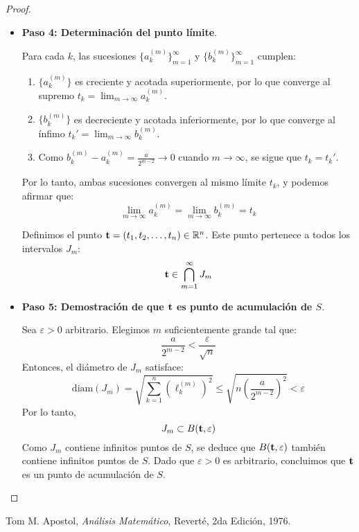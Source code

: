 \documentclass[a4paper,12pt]{article}
\begin{document}
\begin{proof}
\begin{itemize}
    \item \textbf{Paso 4: Determinación del punto límite}.

    Para cada $k$, las sucesiones $\{a_k^{(m)}\}_{m=1}^\infty$ y $\{b_k^{(m)}\}_{m=1}^\infty$ cumplen:
    \begin{enumerate}
        \item $\{a_k^{(m)}\}$ es creciente y acotada superiormente, por lo que converge al supremo $t_k = \lim_{m \to \infty} a_k^{(m)}$.
        \item $\{b_k^{(m)}\}$ es decreciente y acotada inferiormente, por lo que converge al ínfimo $t_k' = \lim_{m \to \infty} b_k^{(m)}$.
        \item Como $b_k^{(m)} - a_k^{(m)} = \frac{a}{2^{m-2}} \to 0$ cuando $m \to \infty$, se sigue que $t_k = t_k'$.
    \end{enumerate}
    Por lo tanto, ambas sucesiones convergen al mismo límite $t_k$, y podemos afirmar que:
    $$\lim_{m \to \infty} a_k^{(m)} = \lim_{m \to \infty} b_k^{(m)} = t_k$$

    Definimos el punto $\mathbf{t} = (t_1, t_2, \dots, t_n) \in \mathbb{R}^n$. Este punto pertenece a todos los intervalos $J_m$:
    $$\mathbf{t} \in \bigcap_{m=1}^\infty J_m$$

    \item \textbf{Paso 5: Demostración de que $\mathbf{t}$ es punto de acumulación de $S$}.

    Sea $\varepsilon > 0$ arbitrario. Elegimos $m$ suficientemente grande tal que:
    $$\frac{a}{2^{m-2}} < \frac{\varepsilon}{\sqrt{n}}$$
    Entonces, el diámetro de $J_m$ satisface:
    $$\text{diam}(J_m) = \sqrt{\sum_{k=1}^n \left(\ell_k^{(m)}\right)^2} \leq \sqrt{n \left(\frac{a}{2^{m-2}}\right)^2} < \varepsilon$$
    Por lo tanto,
    $$J_m \subset B(\mathbf{t}, \varepsilon)$$
    Como $J_m$ contiene infinitos puntos de $S$, se deduce que $B(\mathbf{t}, \varepsilon)$ también contiene infinitos puntos de $S$. Dado que $\varepsilon > 0$ es arbitrario, concluimos que $\mathbf{t}$ es un punto de acumulación de $S$.
\end{itemize}
\end{proof}
\begin{thebibliography}{9}
    Tom M. Apostol, \textit{Análisis Matemático}, Reverté, 2da Edición, 1976.
\end{thebibliography}
\end{document}
